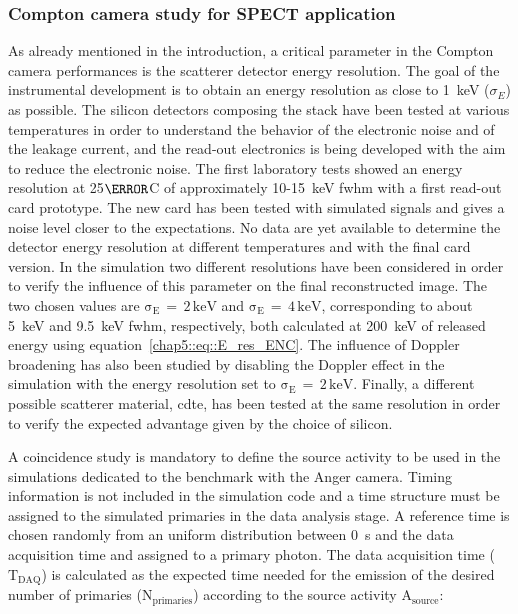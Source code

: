 \subsubsection{Compton camera study for SPECT application}\label{CC_SPECT}
As already mentioned in the introduction, a critical parameter in the Compton camera performances is the scatterer detector energy resolution. The goal of the instrumental development is to obtain an energy resolution as close to 1~keV ($\sigma_{E}$) as possible. The silicon detectors composing the stack have been tested at various temperatures in order to understand the behavior of the electronic noise and of the leakage current, and the read-out electronics is being developed with the aim to reduce the electronic noise. The first laboratory tests showed an energy resolution at 25$\degree$C of approximately 10-15~keV \gls{fwhm} with a first read-out card prototype. The new card has been tested with simulated signals and gives a noise level closer to the expectations. No data are yet available to determine the detector energy resolution at different temperatures and with the final card version. In the simulation two different resolutions have been considered in order to verify the influence of this parameter on the final reconstructed image. The two chosen values are $\mathrm{\sigma_{E}\,=\,2\,keV}$ and $\mathrm{\sigma_{E}\,=\,4\,keV}$, corresponding to about 5~keV and 9.5~keV \gls{fwhm}, respectively, both calculated at 200~keV of released energy using equation~\ref{chap5::eq::E_res_ENC}. The influence of Doppler broadening has also been studied by disabling the Doppler effect in the simulation with the energy resolution set to $\mathrm{\sigma_{E}\,=\,2\,keV}$. Finally, a different possible scatterer material, \gls{cdte}, has been tested at the same resolution in order to verify the expected advantage given by the choice of silicon.

A coincidence study is mandatory to define the source activity to be used in the simulations dedicated to the benchmark with the Anger camera. Timing information is not included in the simulation code and a time structure must be assigned to the simulated primaries in the data analysis stage. A reference time is chosen randomly from an uniform distribution between 0~s and the data acquisition time and assigned to a primary photon. The data acquisition time ($\mathrm{T_{DAQ}}$) is calculated as the expected time needed for the emission of the desired number of primaries ($\mathrm{N_{primaries}}$) according to the source activity $\mathrm{A_{source}}$:

